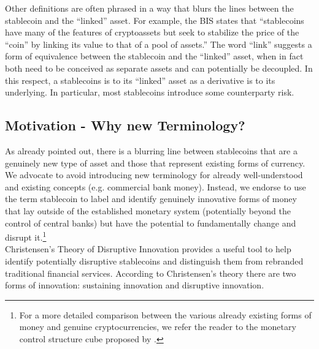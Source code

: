 \documentclass[conference]{IEEEtran}
\begin{document}
Other definitions are often phrased in a way that blurs the lines between the stablecoin and the ``linked'' asset. For example, the \ac{BIS} states that ``stablecoins have many of the features of cryptoassets but seek to stabilize the price of the ``coin'' by linking its value to that of a pool of assets.'' The word ``link'' suggests a form of equivalence between the stablecoin and the ``linked'' asset, when in fact both need to be conceived as separate assets and can potentially be decoupled. In this respect, a stablecoins is to its ``linked'' asset as a derivative is to its underlying. In particular, most stablecoins introduce some counterparty risk.

\subsection{Motivation - Why new Terminology?}
\label{sec:disruption}
As already pointed out, there is a blurring line between stablecoins that are a genuinely new type of asset and those that represent existing forms of currency. We advocate to avoid introducing new terminology for already well-understood and existing concepts (e.g. commercial bank money). Instead, we endorse to use the term stablecoin to label and identify genuinely innovative forms of money that lay outside of the established monetary system (potentially beyond the control of central banks) but have the potential to fundamentally change and disrupt it.\footnote{For a more detailed comparison between the various already existing forms of money and genuine cryptocurrencies, we refer the reader to the monetary control structure cube proposed by \cite{Berentsen}.}\\

Christensen's Theory of Disruptive Innovation provides a useful tool to help identify potentially disruptive stablecoins and distinguish them from rebranded traditional financial services. According to Christensen's theory there are two forms of innovation: sustaining innovation and disruptive innovation.\cite{Christensen}\\
\end{document}
